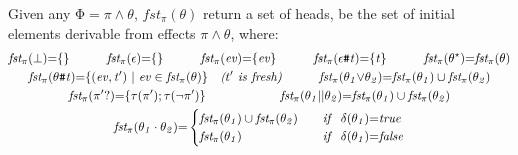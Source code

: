 \documentclass[acmsmall,10pt,review]{acmart}
\newcommand{\es}{\theta}
\newcommand{\ev}{ev}
\newcommand{\effect}{{\ensuremath{\mathrm{\Phi}}}}
\newcommand{\code}[1]{{\tt{\ensuremath{\m{#1}}}}}
\newcommand{\m}{\mathit}
\newcommand{\mysharp}{{\mathrel{\texttt{\#}}}}
\begin{document}
{\begin{definition}[First]\label{First}
  Given any \code{\effect {=} \pi \wedge \es},
  \code{fst_{{\pi}}(\es)} return a set of heads, be the set of initial elements   
  derivable from effects \code{\pi \wedge \es}, where: 
    { 
   \begin{gather*} 
  \code{fst_{{\pi}}( \bot ) {=} \{\} } \qquad\quad 
  \code{fst_{{\pi}}( \epsilon) {=}  \{\} } \qquad\quad
  \code{fst_{{\pi}}( \ev) {=} \{ \ev \}  }
  \qquad\quad
  \code{fst_{{\pi}}(  \epsilon \mysharp  t) {=}  \{ t \}}
  \qquad\quad
  \code{fst_{{\pi}}( {\es^\star} ) {=} fst_{{\pi}}({ \es})}
   \\
   \code{fst_{{\pi}}(\es \mysharp  t) {=}  \{(\ev, t^\prime) \ | \ \ev \in fst_{\pi}(\es) \}} 
   \ \ \  \emph{($t^\prime$\ is\ fresh)}
  \quad  
  \qquad
  \code{fst_{{\pi}}(  \es_1 {\vee} \es_2) {=} fst_{{\pi}}(  \es_1) \cup fst_{{\pi}}(  \es_2)  }  
  \\
  \code{fst_{{\pi}}( \pi^\prime? ) {=} \{\tau(\pi^\prime); \tau(\neg \pi^\prime)\}  }
      \qquad\qquad\qquad 
     \code{fst_{{\pi}}(  \es_1 {||} \es_2) {=} fst_{{\pi}}(  \es_1) \cup fst_{{\pi}}(  \es_2)  }   
     \\
  {
  \code{fst_{{\pi}}(\es_1 \cdot \es_2) {=} } 
  \begin{cases}
        \code{\code{fst_{{\pi}}(  \es_1)} \cup \code{fst_{{\pi}}(  \es_2)} } \quad   & \code{ if\ \  \delta(\es_1) {=} true}\\
        \code{\code{fst_{{\pi}}(  \es_1)}} & \code{  if\ \  \delta(\es_1) {=} false}
      \end{cases} 
      }  
  \end{gather*}
  }
\end{definition}

\begin{comment}
  \begin{definition}[Heads Subsumption]\label{Subsumption1}
Given two time instances \code{(I, \pi_1, t_1)} and \code{(J, \pi_2, t_2)}, we define the subset relation \code{(I, \pi_1, t_1) {\subseteq} (J, \pi_2, t_2)} as:  \code{I {\subseteq} J} and \code{\pi_1[t_2/t_1]  {\Rightarrow}   \pi_2  }.

\end{definition}
\end{comment}



}
\end{document}
